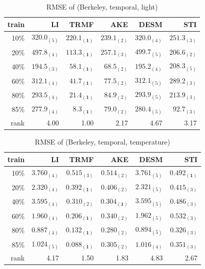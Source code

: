 \begin{table}[htbp]
\centering
\caption{RMSE of (Berkeley, temporal, light)}
\label{table:berkeley_temporal_light}
\begin{tabular}{ r | r r r r r}
	train	&LI	&TRMF	&AKE	&DESM	&STI\\ \hline
	10\% & $ 320.0_{(5)} $ & $ \mathbf{ 220.1_{(1)} } $ & $ 239.1_{(2)} $ & $ 320.0_{(4)} $ & $ 251.3_{(3)} $ \\
	20\% & $ 497.8_{(4)} $ & $ \mathbf{ 113.3_{(1)} } $ & $ 257.1_{(3)} $ & $ 499.7_{(5)} $ & $ 206.6_{(2)} $ \\
	40\% & $ 194.5_{(3)} $ & $ \mathbf{ 58.1_{(1)} } $ & $ 68.5_{(2)} $ & $ 195.2_{(4)} $ & $ 208.3_{(5)} $ \\
	60\% & $ 312.1_{(4)} $ & $ \mathbf{ 41.7_{(1)} } $ & $ 77.5_{(2)} $ & $ 312.1_{(5)} $ & $ 289.2_{(3)} $ \\
	80\% & $ 293.5_{(4)} $ & $ \mathbf{ 21.4_{(1)} } $ & $ 84.9_{(2)} $ & $ 293.9_{(5)} $ & $ 213.9_{(3)} $ \\
	85\% & $ 277.9_{(4)} $ & $ \mathbf{ 8.3_{(1)} } $ & $ 79.0_{(2)} $ & $ 280.4_{(5)} $ & $ 92.7_{(3)} $ \\ \hline
	rank &4.00 &1.00 &2.17 &4.67 &3.17 \\
\end{tabular}
\end{table}


\begin{table}[htbp]
\centering
\caption{RMSE of (Berkeley, temporal, temperature)}
\label{table:berkeley_temporal_tem}
\begin{tabular}{ r | r r r r r}
	train	&LI	&TRMF	&AKE	&DESM	&STI\\ \hline
	10\% & $ 3.760_{(4)} $ & $ 0.515_{(3)} $ & $ 0.514_{(2)} $ & $ 3.761_{(5)} $ & $ \mathbf{ 0.492_{(1)} } $ \\
	20\% & $ 2.320_{(4)} $ & $ \mathbf{ 0.392_{(1)} } $ & $ 0.406_{(2)} $ & $ 2.321_{(5)} $ & $ 0.415_{(3)} $ \\
	40\% & $ 3.595_{(4)} $ & $ 0.310_{(2)} $ & $ \mathbf{ 0.304_{(1)} } $ & $ 3.595_{(5)} $ & $ 0.486_{(3)} $ \\
	60\% & $ 1.960_{(4)} $ & $ \mathbf{ 0.206_{(1)} } $ & $ 0.340_{(2)} $ & $ 1.962_{(5)} $ & $ 0.532_{(3)} $ \\
	80\% & $ 0.887_{(4)} $ & $ \mathbf{ 0.132_{(1)} } $ & $ 0.280_{(2)} $ & $ 0.894_{(5)} $ & $ 0.326_{(3)} $ \\
	85\% & $ 1.024_{(5)} $ & $ \mathbf{ 0.088_{(1)} } $ & $ 0.305_{(2)} $ & $ 1.016_{(4)} $ & $ 0.351_{(3)} $ \\ \hline
	rank &4.17 &1.50 &1.83 &4.83 &2.67 \\
\end{tabular}
\end{table}


